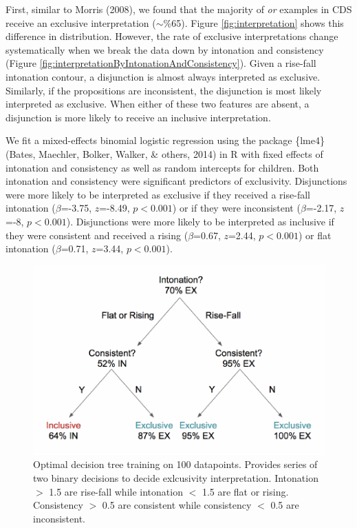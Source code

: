 \documentclass[oneside]{report}
\theoremstyle{definition}
\theoremstyle{definition}
\theoremstyle{definition}
\theoremstyle{remark}
\begin{document}
First, similar to Morris (2008), we found that the majority of \emph{or}
examples in CDS receive an exclusive interpretation (\(\sim\)\%65).
Figure \ref{fig:interpretation} shows this difference in distribution.
However, the rate of exclusive interpretations change systematically
when we break the data down by intonation and consistency (Figure
\ref{fig:interpretationByIntonationAndConsistency}). Given a rise-fall
intonation contour, a disjunction is almost always interpreted as
exclusive. Similarly, if the propositions are inconsistent, the
disjunction is most likely interpreted as exclusive. When either of
these two features are absent, a disjunction is more likely to receive
an inclusive interpretation.

We fit a mixed-effects binomial logistic regression using the package
\{lme4\} (Bates, Maechler, Bolker, Walker, \& others, 2014) in R with
fixed effects of intonation and consistency as well as random intercepts
for children. Both intonation and consistency were significant
predictors of exclusivity. Disjunctions were more likely to be
interpreted as exclusive if they received a rise-fall intonation
(\(\beta\)=-3.75, \(z\)=-8.49, \(p < 0.001\)) or if they were
inconsistent (\(\beta\)=-2.17, \(z\)=-8, \(p < 0.001\)). Disjunctions
were more likely to be interpreted as inclusive if they were consistent
and received a rising (\(\beta\)=0.67, \(z\)=2.44, \(p < 0.001\)) or
flat intonation (\(\beta\)=0.71, \(z\)=3.44, \(p < 0.001\)).
\begin{figure}[tb]

{\centering \includegraphics{figs/treeDiagram-1} 

}

\caption{Optimal decision tree training on 100 datapoints. Provides series of two binary decisions to decide exlcusivity interpretation. Intonation $>$ 1.5 are rise-fall while intonation $<$ 1.5 are flat or rising. Consistency $>$ 0.5 are consistent while consistency $<$ 0.5 are  inconsistent.}\label{fig:treeDiagram}
\end{figure}
\end{document}
